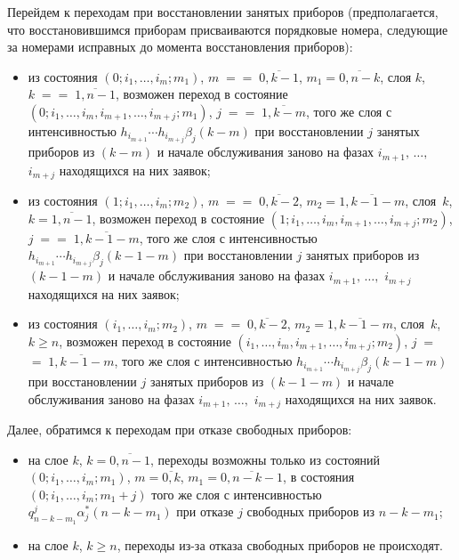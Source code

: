 \begin{multicols}{2}
Перейдем к переходам при восстановлении занятых приборов (предполагается,
что восстановившимся приборам присваиваются порядковые номера,
следующие за номерами исправных до момента восстановления приборов):
\begin{itemize}
\item из состояния $\left(0;i_1,\ldots,i_m;m_1\right)$, $m\;=$\linebreak $=\;\overline{0,k-1}$,
$m_1=\overline{0,n-k}$, слоя $k$, $k\;=$\linebreak $=\;\overline{1,n-1}$, возможен
переход в состояние $\left(0;i_1,\ldots,i_{m},i_{m+1},\ldots,i_{m+j};m_1\right)$,
$j\;=$\linebreak $=\;\overline{1,k-m}$,
того же слоя с интенсивностью $h_{i_{m+1}}\cdots h_{i_{m+j}}\beta_j(k-m)$
при восстановлении $j$ занятых приборов из $(k-m)$ и начале обслуживания
заново на фазах $i_{m+1},\,\ldots,$ $i_{m+j}$ находящихся на них заявок;
\item
 из состояния $(1;i_1,\ldots,i_m;m_2)$, $m\;=$\linebreak $=\;\overline{0,k-2}$,
$m_2=\overline{1,k-1-m}$, слоя~$k$, $k=\overline{1,n-1}$, возможен
переход в состояние $\left(1;i_1,\ldots,i_{m},i_{m+1},\ldots,i_{m+j};m_2\right)$,
$j\;=$\linebreak $=\;\overline{1,k-1-m}$, того же слоя с интенсивностью
$h_{i_{m+1}}\cdots h_{i_{m+j}}\beta_j(k-1-m)$ при восстановлении $j$
занятых приборов из $(k-1-m)$ и начале обслуживания заново на фазах
$i_{m+1},\,\ldots,$ $i_{m+j}$ находящихся на них заявок;
\item
 из состояния $\left(i_1,\ldots,i_m;m_2\right)$, $m\;=$\linebreak $=\;\overline{0,k-2}$,
$m_2=\overline{1,k-1-m}$, слоя~$k$, $k\ge n$, возможен переход в
состояние $\left(i_1,\ldots,i_{m},i_{m+1},\ldots,i_{m+j};m_2\right)$,
$j\;=$\linebreak $=\;\overline{1,k-1-m}$, того же слоя с интенсивностью
$h_{i_{m+1}}\cdots h_{i_{m+j}}\beta_j(k-1-m)$ при восстановлении $j$
занятых приборов из $(k-1-m)$ и начале обслуживания заново на фазах
$i_{m+1},\,\ldots,$ $i_{m+j}$ находящихся на них заявок.
\end{itemize}

Далее, обратимся к переходам при отказе свободных приборов:
\begin{itemize}
\item на слое $k$, $k=\overline{0,n-1}$, переходы возможны только
из состояний $(0;i_1,\ldots,i_m;m_1)$, $m=\overline{0,k}$,
$m_1=\overline{0,n-k-1}$, в состояния $(0;i_1,\ldots,i_m;m_1+j)$
того же слоя с интенсивностью $q^j_{n-k-m_1}\alpha^*_j(n-k-m_1)$
при отказе $j$ свободных приборов из $n-k-m_1$;
\item
на слое $k$, $k\ge n$, переходы из-за отказа свободных приборов
не происходят.
\end{itemize}


\end{multicols}
